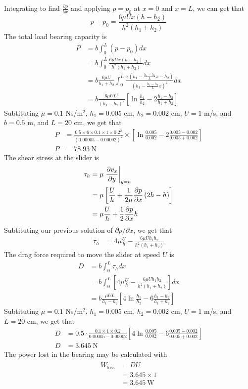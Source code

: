 \documentclass[10pt]{article}
\begin{document}
Integrating to find $\frac{\partial p}{\partial x}$ and applying $p = p_0$ at $x=0$ and $x=L$, we can get that
\begin{equation}
    p - p_0 = \frac{6\mu Ux(h-h_2)}{h^2 (h_1 + h_2)}
\end{equation}
The total load bearing capacity is
\begin{align*}
    P &= b \int_0^L (p - p_0) dx \\
    &= b \int_0^L \frac{6\mu Ux(h-h_2)}{h^2 (h_1 + h_2)} dx \\
    &= b \frac{6\mu U}{h_1 + h_2} \int_0^L \frac{x(h_1 - \frac{h_1 - h_2}{L}x - h_2)}{{\left(h_1 - \frac{h_1 - h_2}{L}x\right)}^2} dx \\
    &= b \frac{6\mu U L^2}{(h_1 - h_2)^2} \left[\ln{\frac{h_1}{h_2} - 2\frac{h_1 - h_2}{h_1 + h_2}} \right]
\end{align*}
Subtituting $\mu = 0.1$ Ns/$\textrm{m}^2$, $h_1 = 0.005$ cm, $h_2 = 0.002$ cm, $U = 1$ m/s, and $b = 0.5$ m, and $L = 20$ cm, we get that
\begin{align*}
    P &= \frac{0.5 \times 6 \times 0.1 \times 1 \times 0.2^2}{(0.00005 - 0.00002)^2} \times \left[\ln{\frac{0.005}{0.002} - 2\frac{0.005 - 0.002}{0.005 + 0.002}} \right] \\
    P &= 78.93\ \textrm{N}
\end{align*}
The shear stress at the slider is
\begin{align*}
    \tau_h &= \mu \eval*{\frac{\partial v_x}{\partial y}}_{y = h} \\
    &= \mu\left[\frac{U}{h} + \frac{1}{2\mu} \frac{\partial p}{\partial x}\left(2h - h\right)\right] \\
    &= \mu \frac{U}{h} + \frac{1}{2}\frac{\partial p}{\partial x}h
\end{align*}
Subtituting our previous solution of $\partial p / \partial x$, we get that
\begin{align*}
    \tau_h &= 4\mu \frac{U}{h} - \frac{6 \mu U h_1 h_2}{h^2 (h_1 + h_2)}
\end{align*}
The drag force required to move the slider at speed $U$ is
\begin{align*}
    D &= b\int_0^L \tau_h dx \\
    &= b\int_0^L \left[4\mu \frac{U}{h} - \frac{6 \mu U h_1 h_2}{h^2 (h_1 + h_2)}\right] dx \\
    &= b\frac{\mu U L}{h_1 - h_2}\left[4 \ln{\frac{h_1}{h_2}} - 6\frac{h_1 - h_2}{h_1 + h_2}\right]
\end{align*}
Subtituting $\mu = 0.1$ Ns/$\textrm{m}^2$, $h_1 = 0.005$ cm, $h_2 = 0.002$ cm, $U = 1$ m/s, and $L = 20$ cm, we get that
\begin{align*}
    D &= 0.5\cdot\frac{0.1 \times 1 \times 0.2}{0.00005 - 0.00002}\left[4 \ln{\frac{0.005}{0.002}} - 6\frac{0.005 - 0.002}{0.005 + 0.002}\right] \\
    D &= 3.645\ \textrm{N}
\end{align*}
The power lost in the bearing may be calculated with
\begin{align*}
    \dot{W}_{\textrm{loss}} &= D U \\
    &= 3.645 \times 1 \\
    &= 3.645\ \textrm{W}
\end{align*}
\end{document}
